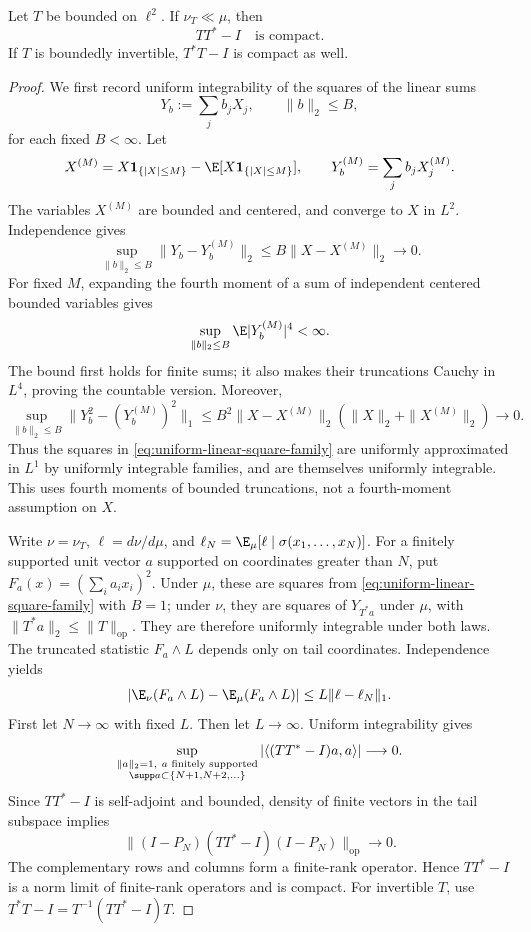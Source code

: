\begin{lemma}
\label{lem:compact-covariance-rigidity}
Let $T$ be bounded on $\ell^2$.  If $\nu_T\ll\mu$, then
\[
 TT^*-I\quad\text{is compact}.
\]
If $T$ is boundedly invertible, $T^*T-I$ is compact as well.
\end{lemma}
\begin{proof}
We first record uniform integrability of the squares of the linear sums
\begin{equation}
 Y_b:=\sum_jb_jX_j,\qquad \|b\|_2\leq B,
 \label{eq:uniform-linear-square-family}
\end{equation}
for each fixed $B<\infty$.  Let
\[
 X^{(M)}=X\mathbf1_{\{|X|\leq M\}}
           -\E[X\mathbf1_{\{|X|\leq M\}}],
 \qquad Y_b^{(M)}=\sum_jb_jX_j^{(M)}.
\]
The variables $X^{(M)}$ are bounded and centered, and converge to $X$
in $L^2$.  Independence gives
\[
 \sup_{\|b\|_2\leq B}\|Y_b-Y_b^{(M)}\|_2
 \leq B\|X-X^{(M)}\|_2\longrightarrow0.
\]
For fixed $M$, expanding the fourth moment of a sum of independent
centered bounded variables gives
\[
 \sup_{\|b\|_2\leq B}\E|Y_b^{(M)}|^4<\infty.
\]
The bound first holds for finite sums; it also makes their truncations
Cauchy in $L^4$, proving the countable version.  Moreover,
\[
 \sup_{\|b\|_2\leq B}
 \bigl\|Y_b^2-(Y_b^{(M)})^2\bigr\|_1
 \leq B^2\|X-X^{(M)}\|_2
                  (\|X\|_2+\|X^{(M)}\|_2)
 \longrightarrow0.
\]
Thus the squares in \eqref{eq:uniform-linear-square-family}
are uniformly approximated in $L^1$ by uniformly integrable families,
and are themselves uniformly integrable.  This uses fourth moments of
bounded truncations, not a fourth-moment assumption on $X$.

Write $\nu=\nu_T$, $\ell=d\nu/d\mu$, and
$\ell_N=\E_\mu[\ell\mid\sigma(x_1,\ldots,x_N)]$.
For a finitely supported unit vector $a$ supported on coordinates greater than
$N$, put
$F_a(x)=(\sum_i a_ix_i)^2$.  Under $\mu$, these are squares from
\eqref{eq:uniform-linear-square-family} with $B=1$; under $\nu$,
they are squares of $Y_{T^*a}$ under $\mu$, with
$\|T^*a\|_2\leq\|T\|_{\mathrm{op}}$.  They are therefore uniformly integrable
under both laws.  The truncated statistic $F_a\wedge L$ depends only
on tail coordinates.  Independence yields
\[
 \left|\E_\nu(F_a\wedge L)-\E_\mu(F_a\wedge L)\right|
 \leq L\|\ell-\ell_N\|_1.
\]
First let $N\to\infty$ with fixed $L$.
Then let $L\to\infty$.
Uniform integrability gives
\[
 \sup_{\substack{\|a\|_2=1,\ a\text{ finitely supported}\\
                  \supp a\subset\{N+1,N+2,\ldots\}}}
 \left|\langle(TT^*-I)a,a\rangle\right|\longrightarrow0.
\]
Since $TT^*-I$ is self-adjoint and bounded, density of finite vectors
in the tail subspace implies
\[
 \|(I-P_N)(TT^*-I)(I-P_N)\|_{\mathrm{op}}\longrightarrow0.
\]
The complementary rows and columns form a finite-rank operator.  Hence
$TT^*-I$ is a norm limit of finite-rank operators and is compact.
For invertible $T$, use
$T^*T-I=T^{-1}(TT^*-I)T$.
\end{proof}

